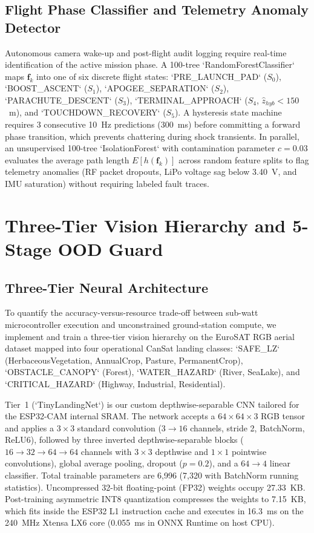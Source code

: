 \documentclass[conference]{IEEEtran}
\begin{document}
\subsection{Flight Phase Classifier and Telemetry Anomaly Detector}
Autonomous camera wake-up and post-flight audit logging require real-time identification of the active mission phase. A 100-tree `RandomForestClassifier` maps $\mathbf{f}_k$ into one of six discrete flight states: `PRE_LAUNCH_PAD` ($S_0$), `BOOST_ASCENT` ($S_1$), `APOGEE_SEPARATION` ($S_2$), `PARACHUTE_DESCENT` ($S_3$), `TERMINAL_APPROACH` ($S_4$, $\hat{z}_{hyb} < 150$~m), and `TOUCHDOWN_RECOVERY` ($S_5$). A hysteresis state machine requires 3 consecutive 10~Hz predictions (300~ms) before committing a forward phase transition, which prevents chattering during shock transients. In parallel, an unsupervised 100-tree `IsolationForest` \cite{liu_isolation_forest} with contamination parameter $c = 0.03$ evaluates the average path length $E[h(\mathbf{f}_k)]$ across random feature splits to flag telemetry anomalies (RF packet dropouts, LiPo voltage sag below 3.40~V, and IMU saturation) without requiring labeled fault traces.

\section{Three-Tier Vision Hierarchy and 5-Stage OOD Guard}

\subsection{Three-Tier Neural Architecture}
To quantify the accuracy-versus-resource trade-off between sub-watt microcontroller execution and unconstrained ground-station compute, we implement and train a three-tier vision hierarchy on the EuroSAT RGB aerial dataset \cite{eurosat_helber} mapped into four operational CanSat landing classes: `SAFE_LZ` (HerbaceousVegetation, AnnualCrop, Pasture, PermanentCrop), `OBSTACLE_CANOPY` (Forest), `WATER_HAZARD` (River, SeaLake), and `CRITICAL_HAZARD` (Highway, Industrial, Residential).

Tier~1 (`TinyLandingNet`) is our custom depthwise-separable CNN tailored for the ESP32-CAM internal SRAM. The network accepts a $64 \times 64 \times 3$ RGB tensor and applies a $3 \times 3$ standard convolution ($3 \rightarrow 16$ channels, stride 2, BatchNorm, ReLU6), followed by three inverted depthwise-separable blocks ($16 \rightarrow 32 \rightarrow 64 \rightarrow 64$ channels with $3 \times 3$ depthwise and $1 \times 1$ pointwise convolutions), global average pooling, dropout ($p = 0.2$), and a $64 \rightarrow 4$ linear classifier. Total trainable parameters are 6,996 (7,320 with BatchNorm running statistics). Uncompressed 32-bit floating-point (FP32) weights occupy 27.33~KB. Post-training asymmetric INT8 quantization compresses the weights to 7.15~KB, which fits inside the ESP32 L1 instruction cache and executes in 16.3~ms on the 240~MHz Xtensa LX6 core (0.055~ms in ONNX Runtime on host CPU).
\end{document}
